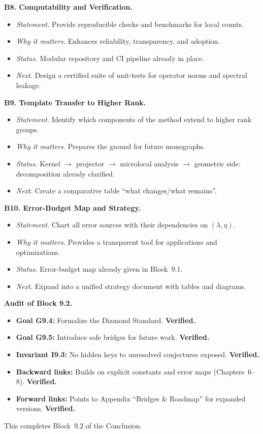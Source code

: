 \medskip
\noindent\textbf{B8. Computability and Verification.}
\begin{itemize}
  \item \emph{Statement.} Provide reproducible checks and benchmarks for local counts.
  \item \emph{Why it matters.} Enhances reliability, transparency, and adoption.
  \item \emph{Status.} Modular repository and CI pipeline already in place.
  \item \emph{Next.} Design a certified suite of unit-tests for operator norms and spectral leakage.
\end{itemize}

\medskip
\noindent\textbf{B9. Template Transfer to Higher Rank.}
\begin{itemize}
  \item \emph{Statement.} Identify which components of the method extend to higher rank groups.
  \item \emph{Why it matters.} Prepares the ground for future monographs.
  \item \emph{Status.} Kernel $\to$ projector $\to$ microlocal analysis $\to$ geometric side: decomposition already clarified.
  \item \emph{Next.} Create a comparative table ``what changes/what remains''.
\end{itemize}

\medskip
\noindent\textbf{B10. Error-Budget Map and Strategy.}
\begin{itemize}
  \item \emph{Statement.} Chart all error sources with their dependencies on $(\lambda,\eta)$.
  \item \emph{Why it matters.} Provides a transparent tool for applications and optimizations.
  \item \emph{Status.} Error-budget map already given in Block~9.1.
  \item \emph{Next.} Expand into a unified strategy document with tables and diagrams.
\end{itemize}

\medskip
\noindent\textbf{Audit of Block 9.2.}
\begin{itemize}
  \item \textbf{Goal G9.4:} Formalize the Diamond Standard. \textbf{Verified.}
  \item \textbf{Goal G9.5:} Introduce safe bridges for future work. \textbf{Verified.}
  \item \textbf{Invariant I9.3:} No hidden keys to unresolved conjectures exposed. \textbf{Verified.}
  \item \textbf{Backward links:} Builds on explicit constants and error maps (Chapters~6–8). \textbf{Verified.}
  \item \textbf{Forward links:} Points to Appendix “Bridges & Roadmap” for expanded versions. \textbf{Verified.}
\end{itemize}
This completes Block~9.2 of the Conclusion.

